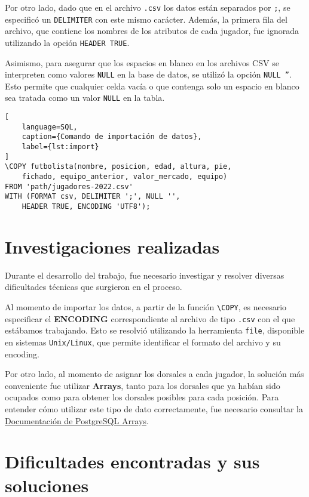 \documentclass{article}
\begin{document}
Por otro lado, dado que en el archivo \texttt{.csv} los datos están separados por \texttt{;}, se especificó un \texttt{DELIMITER} con este mismo carácter. Además, la primera fila del archivo, que contiene los nombres de los atributos de cada jugador, fue ignorada utilizando la opción \texttt{HEADER TRUE}.

Asimismo, para asegurar que los espacios en blanco en los archivos CSV se interpreten como valores \texttt{NULL} en la base de datos, se utilizó la opción \texttt{NULL ''}. Esto permite que cualquier celda vacía o que contenga solo un espacio en blanco sea tratada como un valor \texttt{NULL} en la tabla.

\begin{lstlisting}[
    language=SQL,
    caption={Comando de importación de datos},
    label={lst:import}
]
\COPY futbolista(nombre, posicion, edad, altura, pie, 
    fichado, equipo_anterior, valor_mercado, equipo) 
FROM 'path/jugadores-2022.csv' 
WITH (FORMAT csv, DELIMITER ';', NULL '', 
    HEADER TRUE, ENCODING 'UTF8');
\end{lstlisting}

\section{Investigaciones realizadas}

Durante el desarrollo del trabajo, fue necesario investigar y resolver diversas dificultades técnicas que surgieron en el proceso.

Al momento de importar los datos, a partir de la función \texttt{\textbackslash COPY}, es necesario especificar el \textbf{ENCODING} correspondiente al archivo de tipo \texttt{.csv} con el que estábamos trabajando. Esto se resolvió utilizando la herramienta \texttt{file}, disponible en sistemas \texttt{Unix/Linux}, que permite identificar el formato del archivo y su encoding.

Por otro lado, al momento de asignar los dorsales a cada jugador, la solución más conveniente fue utilizar \textbf{Arrays}, tanto para los dorsales que ya habían sido ocupados como para obtener los dorsales posibles para cada posición. Para entender cómo utilizar este tipo de dato correctamente, fue necesario consultar la \href{https://www.postgresql.org/docs/current/arrays.html}{Documentación de PostgreSQL Arrays}.

\section{Dificultades encontradas y sus soluciones}
\end{document}
